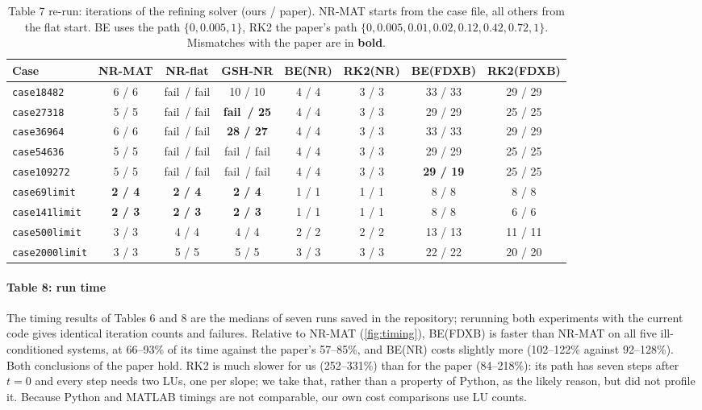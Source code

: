 \documentclass[sigconf,nonacm]{acmart}
\newcommand{\thead}[1]{\textbf{#1}}
\newcommand{\fail}{\textcolor{failred}{fail}}
\newcommand{\code}[1]{\texttt{#1}}
\begin{document}
\begin{table}[t]
\centering
\caption{Table 7 re-run: iterations of the refining solver (ours / paper). NR-MAT starts from the case file,
all others from the flat start. BE uses the path $\{0,0.005,1\}$, RK2 the paper's path $\{0,0.005,0.01,0.02,0.12,0.42,0.72,1\}$.
Mismatches with the paper are in \textbf{bold}.}
\label{tab:t7}
\small
\setlength{\tabcolsep}{6pt}
\begin{tabular}{@{}l c c c c c c c@{}}
\toprule
\thead{Case} & \thead{NR-MAT} & \thead{NR-flat} & \thead{GSH-NR} & \thead{BE(NR)} & \thead{RK2(NR)} & \thead{BE(FDXB)} & \thead{RK2(FDXB)} \\
\midrule
\code{case18482}  & 6 / 6 & \fail\ / \fail & 10 / 10 & 4 / 4 & 3 / 3 & 33 / 33 & 29 / 29 \\
\code{case27318}  & 5 / 5 & \fail\ / \fail & \textbf{\fail\ / 25} & 4 / 4 & 3 / 3 & 29 / 29 & 25 / 25 \\
\code{case36964}  & 6 / 6 & \fail\ / \fail & \textbf{28 / 27} & 4 / 4 & 3 / 3 & 33 / 33 & 29 / 29 \\
\code{case54636}  & 5 / 5 & \fail\ / \fail & \fail\ / \fail & 4 / 4 & 3 / 3 & 29 / 29 & 25 / 25 \\
\code{case109272} & 5 / 5 & \fail\ / \fail & \fail\ / \fail & 4 / 4 & 3 / 3 & \textbf{29 / 19} & 25 / 25 \\
\code{case69limit}   & \textbf{2 / 4} & \textbf{2 / 4} & \textbf{2 / 4} & 1 / 1 & 1 / 1 & 8 / 8 & 8 / 8 \\
\code{case141limit}  & \textbf{2 / 3} & \textbf{2 / 3} & \textbf{2 / 3} & 1 / 1 & 1 / 1 & 8 / 8 & 6 / 6 \\
\code{case500limit}  & 3 / 3 & 4 / 4 & 4 / 4 & 2 / 2 & 2 / 2 & 13 / 13 & 11 / 11 \\
\code{case2000limit} & 3 / 3 & 5 / 5 & 5 / 5 & 3 / 3 & 3 / 3 & 22 / 22 & 20 / 20 \\
\bottomrule
\end{tabular}
\end{table}

\paragraph{Table 8: run time} The timing results of Tables 6 and 8 are the medians of seven runs saved in the repository; rerunning both experiments with the current code gives identical iteration counts and failures. Relative to NR-MAT (\cref{fig:timing}), BE(FDXB) is
faster than NR-MAT on all five ill-conditioned systems, at 66--93\% of its time against the paper's
57--85\%, and BE(NR) costs slightly more (102--122\% against 92--128\%). Both conclusions of the paper hold.
RK2 is much slower for us (252--331\%) than for the paper (84--218\%): its path has seven steps after $t=0$ and every step needs two LUs, one per slope; we take that, rather than a property of Python, as the likely reason, but did not profile it. Because Python and MATLAB timings are not
comparable, our own cost comparisons use LU counts.
\end{document}
